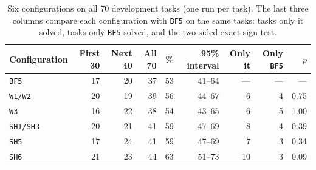 \begin{table}[t]
\centering
\small
\caption{Six configurations on all 70 development tasks (one run per task). The last three columns compare each configuration with \texttt{BF5} on the same tasks: tasks only it solved, tasks only \texttt{BF5} solved, and the two-sided exact sign test.}
\label{tab:pubseventy}
\begin{tabular}{lrrrrrrrr}
\toprule
Configuration & First 30 & Next 40 & All 70 & \% & 95\% interval & Only it & Only \texttt{BF5} & $p$ \\
\midrule
\texttt{BF5} & 17 & 20 & 37 & 53 & 41--64 & --- & --- & --- \\
\texttt{W1/W2} & 20 & 19 & 39 & 56 & 44--67 & 6 & 4 & 0.75 \\
\texttt{W3} & 16 & 22 & 38 & 54 & 43--65 & 6 & 5 & 1.00 \\
\texttt{SH1/SH3} & 20 & 21 & 41 & 59 & 47--69 & 8 & 4 & 0.39 \\
\texttt{SH5} & 17 & 24 & 41 & 59 & 47--69 & 7 & 3 & 0.34 \\
\texttt{SH6} & 21 & 23 & 44 & 63 & 51--73 & 10 & 3 & 0.09 \\
\bottomrule
\end{tabular}
\end{table}
